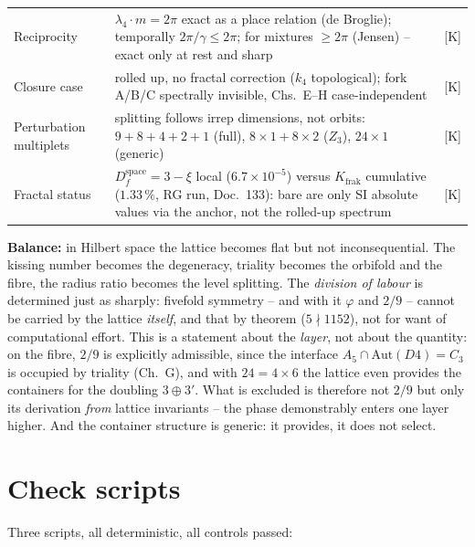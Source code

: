 {\begin{longtable}{lp{6.4cm}l}
Reciprocity & $\lambda_4\cdot m = 2\pi$ exact as a place relation
  (de Broglie); temporally $2\pi/\gamma \le 2\pi$; for mixtures
  $\ge 2\pi$ (Jensen) -- exact only at rest and sharp & [K] \\
Closure case & rolled up, no fractal correction ($k_4$
  topological); fork A/B/C spectrally invisible, Chs.~E--H
  case-independent & [K] \\
Perturbation multiplets & splitting follows irrep dimensions, not
  orbits: $9{+}8{+}4{+}2{+}1$ (full), $8{\times}1{+}8{\times}2$
  ($Z_3$), $24{\times}1$ (generic) & [K] \\
Fractal status & $D_f^\text{space} = 3-\xi$ local
  ($6.7{\times}10^{-5}$) versus $K_\text{frak}$ cumulative
  ($1.33\,\%$, RG run, Doc.~133): bare are only SI absolute values
  via the anchor, not the rolled-up spectrum & [K] \\
\end{longtable}
}

\medskip
\noindent\textbf{Balance:} in Hilbert space the lattice becomes flat
but not inconsequential. The kissing number becomes the degeneracy,
triality becomes the orbifold and the fibre, the radius ratio
becomes the level splitting. The \emph{division of labour} is
determined just as sharply: fivefold symmetry -- and with it
$\varphi$ and $2/9$ -- cannot be carried by the lattice
\emph{itself}, and that by theorem ($5 \nmid 1152$), not for want
of computational effort. This is a statement about the
\emph{layer}, not about the quantity: on the fibre, $2/9$ is
explicitly admissible, since the interface
$A_5 \cap \text{Aut}(D4) = C_3$ is occupied by triality (Ch.~G),
and with $24 = 4\times6$ the lattice even provides the containers
for the doubling $3\oplus3'$. What is excluded is therefore not
$2/9$ but only its derivation \emph{from} lattice invariants --
the phase demonstrably enters one layer higher. And the container
structure is generic: it provides, it does not select.

\chapter{Check scripts}

Three scripts, all deterministic, all controls passed:

